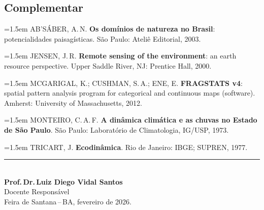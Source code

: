 \documentclass[11pt,a4paper]{article}
\begin{document}
\subsection*{Complementar}

\begin{small}
\hangindent=1.5em
AB'SÁBER, A.\,N. \textbf{Os domínios de natureza no Brasil}: potencialidades paisagísticas. São Paulo: Ateliê Editorial, 2003.\par\medskip

\hangindent=1.5em
JENSEN, J.\,R. \textbf{Remote sensing of the environment}: an earth resource perspective. Upper Saddle River, NJ: Prentice Hall, 2000.\par\medskip

\hangindent=1.5em
MCGARIGAL, K.; CUSHMAN, S.\,A.; ENE, E. \textbf{FRAGSTATS v4}: spatial pattern analysis program for categorical and continuous maps (software). Amherst: University of Massachusetts, 2012.\par\medskip

\hangindent=1.5em
MONTEIRO, C.\,A.\,F. \textbf{A dinâmica climática e as chuvas no Estado de São Paulo}. São Paulo: Laboratório de Climatologia, IG/USP, 1973.\par\medskip

\hangindent=1.5em
TRICART, J. \textbf{Ecodinâmica}. Rio de Janeiro: IBGE; SUPREN, 1977.
\end{small}

\vfill

\begin{center}
\noindent\rule{6cm}{0.4pt}\\[6pt]
\textbf{Prof.\,Dr.\,Luiz Diego Vidal Santos}\\
Docente Responsável\\[4pt]
{\small Feira de Santana\,--\,BA, fevereiro de 2026.}
\end{center}
\end{document}

